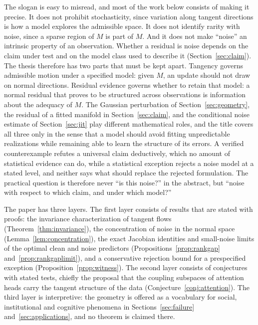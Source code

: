 \documentclass[11pt,a4paper]{article}
\theoremstyle{definition}
\theoremstyle{remark}
\begin{document}
The slogan is easy to misread, and most of the work below consists of
making it precise. It does not prohibit stochasticity, since variation
along tangent directions is how a model explores the admissible space. It
does not identify rarity with noise, since a sparse region of $M$ is part
of $M$. And it does not make ``noise'' an intrinsic property of an
observation. Whether a residual is noise depends on the claim under test and on the model class used to describe it (Section~\ref{sec:claim}). The thesis therefore has two parts that must be kept apart. Tangency governs admissible motion under a specified model: given $M$, an update should not draw on normal directions. Residual evidence governs whether to retain that model: a normal residual that proves to be structured across observations is information about the adequacy of $M$. The Gaussian perturbation of Section~\ref{sec:geometry}, the residual of a fitted manifold in Section~\ref{sec:claim}, and the conditional noise estimate of Section~\ref{sec:jit} play different mathematical roles, and the title covers all three only in the sense that a model should avoid fitting unpredictable realizations while remaining able to learn the structure of its errors. A verified counterexample refutes a universal claim deductively, which no amount of statistical evidence can do, while a statistical exception rejects a noise model at a stated level, and neither says what should replace the rejected formulation. The practical question is therefore never ``is this noise?'' in the abstract, but ``noise with respect to which claim, and under which model?''

The paper has three layers. The first layer consists of results that are
stated with proofs: the invariance characterization of tangent flows
(Theorem~\ref{thm:invariance}), the concentration of noise in the normal
space (Lemma~\ref{lem:concentration}), the exact Jacobian identities and small-noise limits of the optimal clean and noise predictors (Propositions~\ref{prop:rankgap} and~\ref{prop:rankgaplimit}), and a conservative rejection bound for a prespecified exception (Proposition~\ref{prop:witness}). The second layer consists of
conjectures with stated tests, chiefly the proposal that the coupling
subspaces of attention heads carry the tangent structure of the data
(Conjecture~\ref{conj:attention}). The third layer is interpretive: the
geometry is offered as a vocabulary for social, institutional and
cognitive phenomena in Sections~\ref{sec:failure} and~\ref{sec:applications}, and
no theorem is claimed there.
\end{document}
